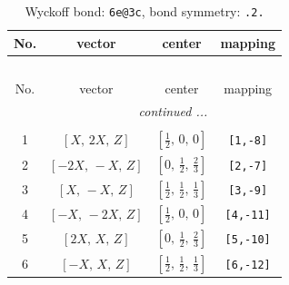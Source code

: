 \documentclass[fleqn,8pt]{jsarticle}
\begin{document}
\renewcommand{\arraystretch}{1.2}
\begin{longtable}{cccc}
\caption{Wyckoff bond: {\tt 6e@3c}, bond symmetry: {\tt .2.}}
 \\
 \hline \hline
No. & vector & center & mapping \\ \hline \endfirsthead

\multicolumn{3}{l}{\tablename\ \thetable{}} \\
 \hline \hline
No. & vector & center & mapping \\ \hline \endhead

 \hline \hline
\multicolumn{3}{r}{\footnotesize\it continued ...} \\ \endfoot

 \hline \hline
\multicolumn{3}{r}{} \\ \endlastfoot

1 & $\left[ X,\, 2 X,\, Z \right]$ & $\left[ \frac{1}{2},\, 0,\, 0 \right]$ & {\tt [1,-8]} \\ \hline
2 & $\left[ - 2 X,\, - X,\, Z \right]$ & $\left[ 0,\, \frac{1}{2},\, \frac{2}{3} \right]$ & {\tt [2,-7]} \\ \hline
3 & $\left[ X,\, - X,\, Z \right]$ & $\left[ \frac{1}{2},\, \frac{1}{2},\, \frac{1}{3} \right]$ & {\tt [3,-9]} \\ \hline
4 & $\left[ - X,\, - 2 X,\, Z \right]$ & $\left[ \frac{1}{2},\, 0,\, 0 \right]$ & {\tt [4,-11]} \\ \hline
5 & $\left[ 2 X,\, X,\, Z \right]$ & $\left[ 0,\, \frac{1}{2},\, \frac{2}{3} \right]$ & {\tt [5,-10]} \\ \hline
6 & $\left[ - X,\, X,\, Z \right]$ & $\left[ \frac{1}{2},\, \frac{1}{2},\, \frac{1}{3} \right]$ & {\tt [6,-12]} \\
\end{longtable}
\renewcommand{\arraystretch}{1.2}
\end{document}
